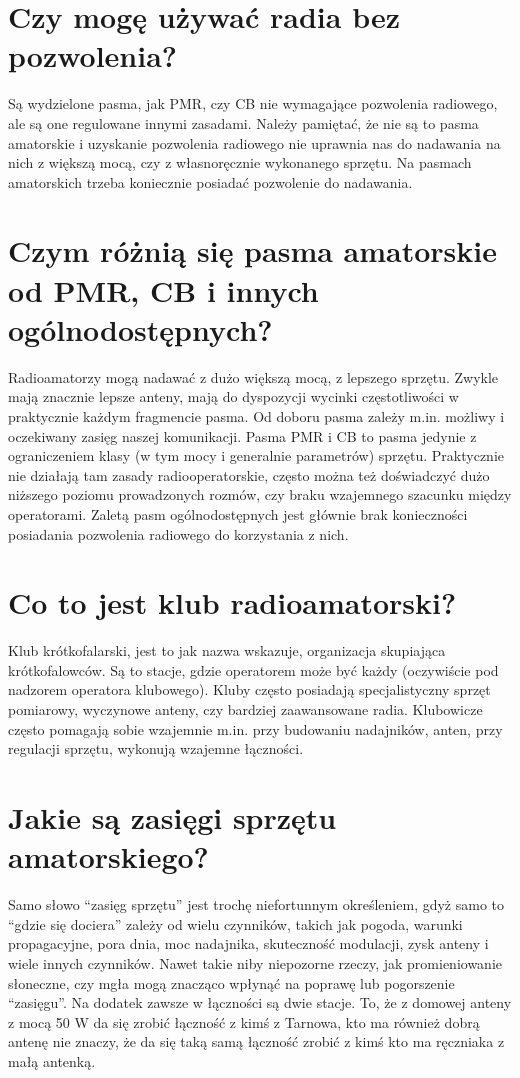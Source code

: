 \documentclass[a4paper,12pt]{article}
\begin{document}
\section{Czy mogę używać radia bez pozwolenia?}
Są wydzielone pasma, jak PMR, czy CB nie wymagające pozwolenia radiowego, ale są one regulowane innymi zasadami. Należy pamiętać, że nie są to pasma amatorskie i uzyskanie pozwolenia radiowego nie uprawnia nas do nadawania na nich z większą mocą, czy z własnoręcznie wykonanego sprzętu. Na pasmach amatorskich trzeba koniecznie posiadać pozwolenie do nadawania.

\section{Czym różnią się pasma amatorskie od PMR, CB i innych ogólnodostępnych?}
Radioamatorzy mogą nadawać z dużo większą mocą, z lepszego sprzętu. Zwykle mają znacznie lepsze anteny, mają do dyspozycji wycinki częstotliwości w praktycznie każdym fragmencie pasma.
Od doboru pasma zależy m.in. możliwy i oczekiwany zasięg naszej komunikacji. Pasma PMR i CB to pasma jedynie z ograniczeniem klasy (w tym mocy i generalnie parametrów) sprzętu. Praktycznie nie działają tam zasady radiooperatorskie, często można też doświadczyć dużo niższego poziomu prowadzonych rozmów, czy braku wzajemnego szacunku między operatorami. Zaletą pasm ogólnodostępnych jest głównie brak konieczności posiadania pozwolenia radiowego do korzystania z nich.

\section{Co to jest klub radioamatorski?}
Klub krótkofalarski, jest to jak nazwa wskazuje, organizacja skupiająca krótkofalowców. Są to stacje, gdzie operatorem może być każdy (oczywiście pod nadzorem operatora klubowego). Kluby często posiadają specjalistyczny sprzęt pomiarowy, wyczynowe anteny, czy bardziej zaawansowane radia. Klubowicze często pomagają sobie wzajemnie m.in. przy budowaniu nadajników, anten, przy regulacji sprzętu, wykonują wzajemne łączności. 

\section{Jakie są zasięgi sprzętu amatorskiego?}
Samo słowo “zasięg sprzętu” jest trochę niefortunnym określeniem, gdyż samo to “gdzie się dociera” zależy od wielu czynników, takich jak pogoda, warunki propagacyjne, pora dnia, moc nadajnika, skuteczność modulacji, zysk anteny i wiele innych czynników. Nawet takie niby niepozorne rzeczy, jak promieniowanie słoneczne, czy mgła mogą znacząco wpłynąć na poprawę lub pogorszenie “zasięgu”.
Na dodatek zawsze w łączności są dwie stacje. To, że z domowej anteny z mocą 50 W da się zrobić łączność z kimś z Tarnowa, kto ma również dobrą antenę nie znaczy, że da się taką samą łączność zrobić z kimś kto ma ręczniaka z małą antenką. 
\\
\end{document}
